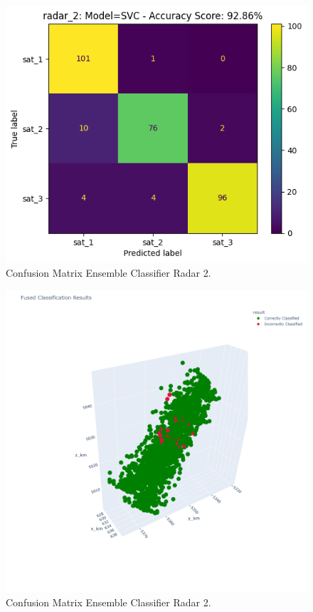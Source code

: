 \documentclass[./report_entry.tex]{subfiles}
\begin{document}
            \begin{figure}[!htbp]
                \centering
                \includegraphics[scale=0.80]{../graphics/CM_radar2.png}
                \caption{Confusion Matrix Ensemble Classifier Radar 2.}
                \label{cm2}
            \end{figure}

            \begin{figure}[!htbp]
                \centering
                \includegraphics[scale=0.45]{../graphics/final_class.png}
                \caption{Confusion Matrix Ensemble Classifier Radar 2.}
                \label{final}
            \end{figure}
\end{document}
